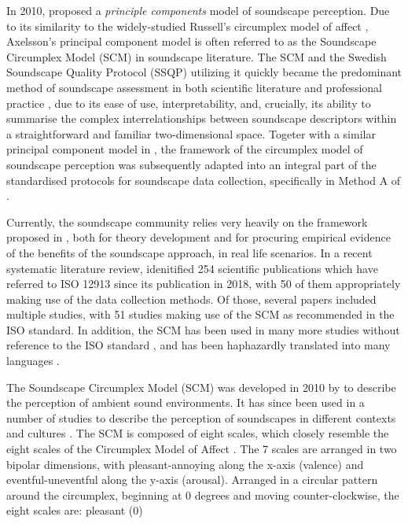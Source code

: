\documentclass[
  authoryear,
  preprint,
  3p]{elsarticle}
\begin{document}
In 2010, \citet{Axelsson2010principal} proposed a \emph{principle
components} model of soundscape perception. Due to its similarity to the
widely-studied Russell's circumplex model of affect
\citep{Russell1980circumplex}, Axelsson's principal component model is
often referred to as the Soundscape Circumplex Model (SCM) in soundscape
literature. The SCM and the Swedish Soundscape Quality Protocol (SSQP)
\citep{Axelsson2012Swedish} utilizing it quickly became the predominant
method of soundscape assessment in both scientific literature and
professional practice \citep{Aletta2023Adoption}, due to its ease of
use, interpretability, and, crucially, its ability to summarise the
complex interrelationships between soundscape descriptors within a
straightforward and familiar two-dimensional space. Togeter with a
similar principal component model in \citet{Cain2013development}, the
framework of the circumplex model of soundscape perception was
subsequently adapted into an integral part of the standardised protocols
for soundscape data collection, specifically in Method A of
\citet{ISO12913Part2}.

Currently, the soundscape community relies very heavily on the framework
proposed in \citet{ISO12913Part2}, both for theory development and for
procuring empirical evidence of the benefits of the soundscape approach,
in real life scenarios. In a recent systematic literature review,
\citet{Aletta2023Adoption} idenitified 254 scientific publications which
have referred to ISO 12913 since its publication in 2018, with 50 of
them appropriately making use of the data collection methods. Of those,
several papers included multiple studies, with 51 studies making use of
the SCM as recommended in the ISO standard. In addition, the SCM has
been used in many more studies without reference to the ISO standard
\citep{Engel2018Review}, and has been haphazardly translated into many
languages
\citep{Tarlao2016Comparing, Nagahata2019Examination, Tarlao2020Investigating, Aletta2019Exploringa}.

The Soundscape Circumplex Model (SCM) was developed in 2010 by
\citet{Axelsson2010principal} to describe the perception of ambient
sound environments. It has since been used in a number of studies to
describe the perception of soundscapes in different contexts and
cultures \citep{ISO12913Part2}. The SCM is composed of eight scales,
which closely resemble the eight scales of the Circumplex Model of
Affect \citep{Russell1980circumplex}. The 7 scales are arranged in two
bipolar dimensions, with pleasant-annoying along the x-axis (valence)
and eventful-uneventful along the y-axis (arousal). Arranged in a
circular pattern around the circumplex, beginning at 0 degrees and
moving counter-clockwise, the eight scales are: pleasant (0)
\end{document}
